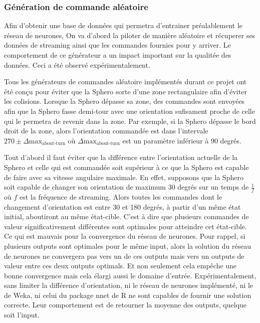\subsubsection{Génération de commande aléatoire}
Afin d'obtenir une base de données qui permetra d'entrainer préalablement le réseau de neurones,
On va d'abord la piloter de manière aléatoire et récuperer ses données de streaming ainsi que les commandes fournies pour y arriver.
Le comportement de ce générateur a un impact important sur la qualitée des données.
Ceci a été observé expérimentalement.

Tous les générateurs de commandes aléatoire implémentés durant ce projet ont été conçu pour éviter que la Sphero sorte d'une zone rectangulaire afin d'éviter les colisions.
Lorsque la Sphero dépasse sa zone, des commandes sont envoyées afin que la Sphero fasse demi-tour avec une orientation sufisament proche de celle qui le permetra de revenir dans la zone.
Par exemple, si la Sphero dépasse le bord droit de la zone,
alors l'orientation commandée est dans l'intervale $270 \pm \Delta\text{max}_{\text{about-turn}}$ où $\Delta\text{max}_{\text{about-turn}}$ est un paramètre inférieur à 90 degrés.

Tout d'abord il faut éviter que la différence entre l'orientation actuelle de la Sphero et celle qui est commandée soit supérieur à ce que la Sphero est capable de faire avec sa vitesse angulaire maximale.
En effet, supposons que la Sphero soit capable de changer son orientation de maximum 30 degrés sur un temps de $\frac{1}{f}$ où $f$ est la fréquence de streaming.
Alors toutes les commandes dont le changement d'orientation est entre 30 et 180 degrés, à partir d'un même état initial, aboutiront au même état-cible.
C'est à dire que plusieurs commandes de valeur significativement différentes sont optimales pour atteindre cet état-cible.
Ce qui est mauvais pour la convergence du réseau de neurones.
Pour rappel, si plusieurs outputs sont optimales pour le même input, alors la solution du réseau de neurones ne convergera pas vers un de ces outputs mais vers un outputs de valeur entre ces deux outputs optimals.
Et non seulement cela empêche une bonne convergence mais cela élargi aussi le domaine d'entrée.
Expérimentalement, sans limiter la différence d'orientation, ni le réseau de neurones implémenté, ni le \mlp de Weka, ni celui du package nnet de R ne sont capables de fournir une solution correcte.
Leur comportement est de retourner la moyenne des outputs, quelque soit l'input.\\


